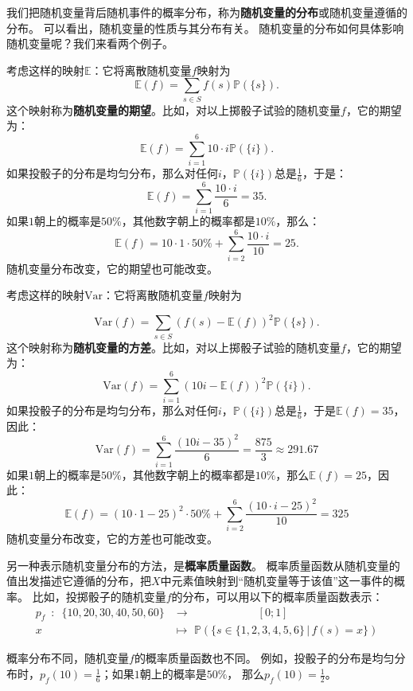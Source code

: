 \documentclass[12pt,UTF8,fontset=none]{ctexbook}
\begin{document}
我们把随机变量背后随机事件的概率分布，称为\textbf{随机变量的分布}或随机变量遵循的分布。
可以看出，随机变量的性质与其分布有关。
随机变量的分布如何具体影响随机变量呢？我们来看两个例子。
\begin{ex}
    考虑这样的映射$\mathbb{E}$：它将离散随机变量$f$映射为
    $$ \mathbb{E}(f) = \sum_{s\in S} f(s) \mathbb{P}(\{s\}).$$
    这个映射称为\textbf{随机变量的期望}。比如，对以上掷骰子试验的随机变量$f$，它的期望为：
    $$ \mathbb{E}(f) = \sum_{i=1}^6 10\cdot i \mathbb{P}(\{i\}).$$
    如果投骰子的分布是均匀分布，那么对任何$i$​，$\mathbb{P}(\{i\})$​总是$\frac{1}{6}$​，于是：
    $$ \mathbb{E}(f) = \sum_{i=1}^6 \frac{10\cdot i}{6} = 35. $$
    如果$1$朝上的概率是$50\%$，其他数字朝上的概率都是$10\%$​，那么：
    $$ \mathbb{E}(f) = 10\cdot 1\cdot 50\% + \sum_{i=2}^6 \frac{10\cdot i}{10} = 25. $$
    随机变量分布改变，它的期望也可能改变。
\end{ex}
\begin{ex}
    考虑这样的映射$\mathrm{Var}$：它将离散随机变量$f$映射为

    $$ \mathrm{Var}(f) = \sum_{s\in S} \left(f(s) - \mathbb{E}(f)\right)^2 \mathbb{P}(\{s\}).$$
    这个映射称为\textbf{随机变量的方差}。比如，对以上掷骰子试验的随机变量$f$，它的期望为：
    $$ \mathrm{Var}(f) = \sum_{i=1}^6 \left(10i - \mathbb{E}(f)\right)^2 \mathbb{P}(\{i\}).$$
    如果投骰子的分布是均匀分布，那么对任何$i$，$\mathbb{P}(\{i\})$总是$\frac{1}{6}$，于是$\mathbb{E}(f) = 35$，因此：
    $$\mathrm{Var}(f) = \sum_{i=1}^6 \frac{\left(10i - 35\right)^2}{6} = \frac{875}{3} \approx 291.67$$    
    如果$1$朝上的概率是$50\%$，其他数字朝上的概率都是$10\%$，那么$\mathbb{E}(f) = 25$，因此：    
    $$ \mathbb{E}(f) = (10\cdot 1 - 25)^2\cdot 50\% + \sum_{i=2}^6 \frac{(10\cdot i - 25)^2}{10} = 325 $$
    随机变量分布改变，它的方差也可能改变。
\end{ex}

另一种表示随机变量分布的方法，是\textbf{概率质量函数}。
概率质量函数从随机变量的值出发描述它遵循的分布，把$X$中元素值映射到“随机变量等于该值”这一事件的概率。
比如，投掷骰子的随机变量$f$的分布，可以用以下的概率质量函数表示：
\begin{align*}
p_f \,\,\, : \,\,\,  \{10,20,30,40,50,60\} &\rightarrow \qquad\qquad\qquad [0; 1]  \\
  x\qquad\qquad &\mapsto \,\, \mathbb{P}(\{s \in \{1,2,3,4,5,6\} \,|\, f(s) = x\})  
\end{align*}

概率分布不同，随机变量$f$的概率质量函数也不同。
例如，投骰子的分布是均匀分布时，$p_f(10) = \frac{1}{6}$；如果$1$朝上的概率是$50\%$，
那么$p_f(10) = \frac{1}{2}$。
\end{document}
